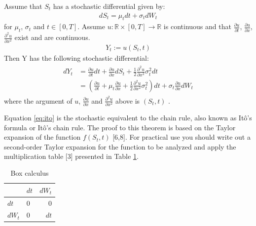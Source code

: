 \documentclass[12pt,twoside]{reedthesis}
\theoremstyle{definition}
\theoremstyle{definition}
\theoremstyle{remark}
\let\BeginKnitrBlock\begin \let\EndKnitrBlock\end
\begin{document}
  \BeginKnitrBlock{lemma}[Itô's Lemma]
  
  \protect\hypertarget{lem:itolemma}{}{\label{lem:itolemma} {} } Assume that \(S_t\) has a stochastic differential given
  by:
  \begin{align}
  dS_t = \mu_t dt + \sigma_t dW_t 
  \end{align}
  \noindent
  for \(\mu_t\), \(\sigma_t\) and \(t \in [0,T]\). Assume
  \(u: \mathbb{R} \times [0, T] \rightarrow \mathbb{R}\) is continuous and
  that \(\frac{\partial u}{\partial t}\),
  \(\frac{\partial u}{\partial x}\), \(\frac{\partial^2 u}{\partial x^2}\)
  exist and are continuous.
  \begin{align*}
  Y_t := u(S_t, t)
  \end{align*}
  \noindent
  Then Y has the following stochastic differential:
  \begin{align} 
  \label{eq:ito}
  \begin{split}
      dY_t &= \frac{\partial u}{\partial t}dt + \frac{\partial u}{\partial x} dS_t + \frac{1}{2}\frac{\partial^2 u}{\partial x^2}\sigma_t^2 dt  \\[10pt] 
      &= \left( \frac{\partial u}{\partial t} + \mu_t \frac{\partial u}{\partial x} + \frac{1}{2}\frac{\partial^2 u}{\partial x^2}\sigma_t^2 \right) dt + \sigma_t \frac{\partial u}{\partial x} dW_t
  \end{split}
  \end{align}
  \noindent  where the argument of \(u\),
  \(\frac{\partial u}{\partial x}\) and
  \(\frac{\partial^2 u}{\partial x^2}\) above is \(\left( S_t, t \right)\)
  .
  
  \EndKnitrBlock{lemma}
  
  Equation \eqref{eq:ito} is the stochastic equivalent to the chain rule,
  also known as Itô's formula or Itô's chain rule. The proof to this
  theorem is based on the Taylor expansion of the function \(f(S_t, t)\)
  {[}6,8{]}. For practical use you should write out a second-order Taylor
  expansion for the function to be analyzed and apply the multiplication
  table {[}3{]} presented in Table \ref{mat}.
  \begin{table}[ht]
  \centering
  \begin{tabular}{llr}
    \hline 
   & $dt$ & $dW_t$ \\ 
    \hline 
  $dt$ & 0 & 0 \\ 
    $dW_t$ & 0 & $dt$ \\ 
     \hline 
  \end{tabular}
  \caption{Box calculus} 
  \label{mat}
  \end{table}
\end{document}

